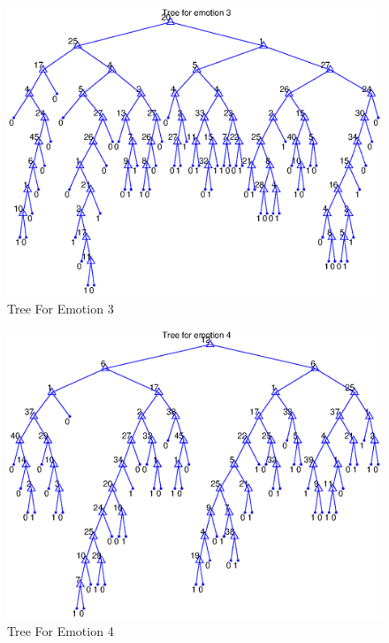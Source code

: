 \documentclass[10pt,a4paper]{article}
\begin{document}
\begin{figure}[!hb]
	\centering
	\includegraphics[width=\textwidth]{trees/tree3.eps}
     \caption{Tree For Emotion 3}
     \label{fig:tree3}
\end{figure}
\begin{figure}[!ht]
	\centering
	\includegraphics[width=\textwidth]{trees/tree4.eps}
     \caption{Tree For Emotion 4}
     \label{fig:tree4}
\end{figure}
\end{document}
